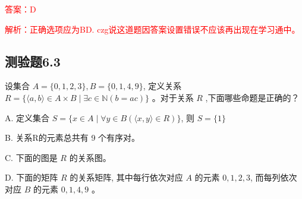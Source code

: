 \documentclass[UTF8, heading=true]{ctexart}
\begin{document}
\textcolor{red}{答案：D}

\textcolor{red}{解析：正确选项应为BD.  czg说这道题因答案设置错误不应该再出现在学习通中。}

\subsection{测验题6.3}

设集合 $A=\{0,1,2,3\}, B=\{0,1,4,9\}$, 定义关系 $R=\{\langle a, b\rangle \in A \times B \mid \exists c \in \mathbb{N}(b=a c)\}$ 。对于关系 $R$ ,下面哪些命题是正确的？

A. 定义集合 $S=\{x \in A \mid \forall y \in B(\langle x, y\rangle \in R)\}$, 则 $S=\{1\}$

B. 关系R的元素总共有 9 个有序对。

C. 下面的图是 $R$ 的关系图。

D. 下面的矩阵 $R$ 的关系矩阵, 其中每行依次对应 $A$ 的元素 $0,1,2,3$, 而每列依次对应 $B$ 的元素 $0,1,4,9$ 。
\end{document}
